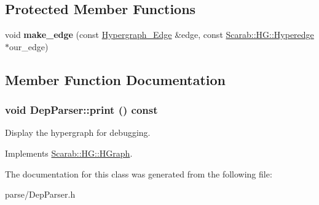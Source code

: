 \subsection*{Protected Member Functions}
\begin{DoxyCompactItemize}
\item 
\hypertarget{classDepParser_a04d313d931d1e8b0bac3a36ca7be469b}{
void {\bfseries make\_\-edge} (const \hyperlink{classHypergraph__Edge}{Hypergraph\_\-Edge} \&edge, const \hyperlink{classScarab_1_1HG_1_1Hyperedge}{Scarab::HG::Hyperedge} $\ast$our\_\-edge)}
\label{classDepParser_a04d313d931d1e8b0bac3a36ca7be469b}

\end{DoxyCompactItemize}


\subsection{Member Function Documentation}
\hypertarget{classDepParser_a9aebbbde821bad423b6c01cc12f02a2c}{
\subsubsection[{print}]{\setlength{\rightskip}{0pt plus 5cm}void DepParser::print () const}}
\label{classDepParser_a9aebbbde821bad423b6c01cc12f02a2c}
Display the hypergraph for debugging. 

Implements \hyperlink{classScarab_1_1HG_1_1HGraph_ab5aa11c932b28864b56f28e0babbc1c1}{Scarab::HG::HGraph}.



The documentation for this class was generated from the following file:\begin{DoxyCompactItemize}
\item 
parse/DepParser.h\end{DoxyCompactItemize}
